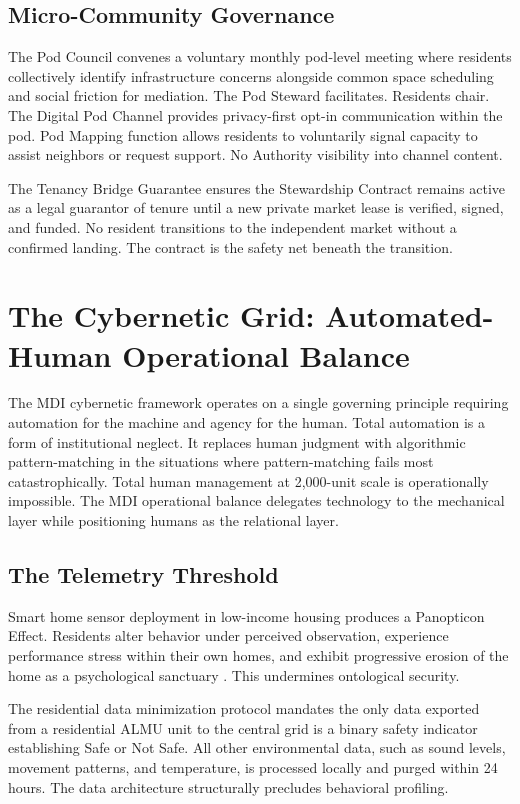 \documentclass[12pt, letterpaper]{article}
\begin{document}
\subsection{Micro-Community Governance}

The Pod Council convenes a voluntary monthly pod-level meeting where residents collectively identify infrastructure concerns alongside common space scheduling and social friction for mediation. The Pod Steward facilitates. Residents chair. The Digital Pod Channel provides privacy-first opt-in communication within the pod. Pod Mapping function allows residents to voluntarily signal capacity to assist neighbors or request support. No Authority visibility into channel content.

The Tenancy Bridge Guarantee ensures the Stewardship Contract remains active as a legal guarantor of tenure until a new private market lease is verified, signed, and funded. No resident transitions to the independent market without a confirmed landing. The contract is the safety net beneath the transition.

\clearpage
\section{The Cybernetic Grid: Automated-Human Operational Balance}

The MDI cybernetic framework operates on a single governing principle requiring automation for the machine and agency for the human. Total automation is a form of institutional neglect. It replaces human judgment with algorithmic pattern-matching in the situations where pattern-matching fails most catastrophically. Total human management at 2,000-unit scale is operationally impossible. The MDI operational balance delegates technology to the mechanical layer while positioning humans as the relational layer.

\subsection{The Telemetry Threshold}

Smart home sensor deployment in low-income housing produces a Panopticon Effect. Residents alter behavior under perceived observation, experience performance stress within their own homes, and exhibit progressive erosion of the home as a psychological sanctuary \citep{nyu_marron_2024, usc_surveillance_2024}. This undermines ontological security.

The residential data minimization protocol mandates the only data exported from a residential ALMU unit to the central grid is a binary safety indicator establishing Safe or Not Safe. All other environmental data, such as sound levels, movement patterns, and temperature, is processed locally and purged within 24 hours. The data architecture structurally precludes behavioral profiling.
\end{document}
